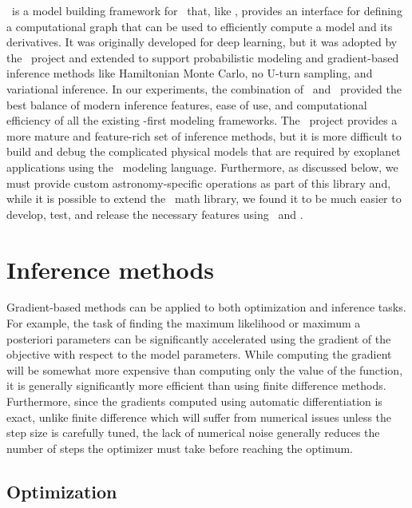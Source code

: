 \documentclass[modern]{aastex62}
\begin{document}
\theano\ is a model building framework for \python\ that, like \tensorflow, provides an interface for defining a computational graph that can be used to efficiently compute a model and its derivatives.
It was originally developed for deep learning, but it was adopted by the \pymc\ project and extended to support probabilistic modeling and gradient-based inference methods like Hamiltonian Monte Carlo, no U-turn sampling, and variational inference.
In our experiments, the combination of \theano\ and \pymc\ provided the best balance of modern inference features, ease of use, and computational efficiency of all the existing \python-first modeling frameworks.
The \stan\ project provides a more mature and feature-rich set of inference methods, but it is more difficult to build and debug the complicated physical models that are required by exoplanet applications using the \stan\ modeling language.
Furthermore, as discussed below, we must provide custom astronomy-specific operations as part of this library and, while it is possible to extend the \stan\ math library, we found it to be much easier to develop, test, and release the necessary features using \pymc\ and \theano.


\section{Inference methods}

Gradient-based methods can be applied to both optimization and inference tasks.
For example, the task of finding the maximum likelihood or maximum a posteriori parameters can be significantly accelerated using the gradient of the objective with respect to the model parameters.
While computing the gradient will be somewhat more expensive than computing only the value of the function, it is generally significantly more efficient than using finite difference methods.
Furthermore, since the gradients computed using automatic differentiation is exact, unlike finite difference which will suffer from numerical issues unless the step size is carefully tuned, the lack of numerical noise generally reduces the number of steps the optimizer must take before reaching the optimum.

\subsection{Optimization}
\end{document}
